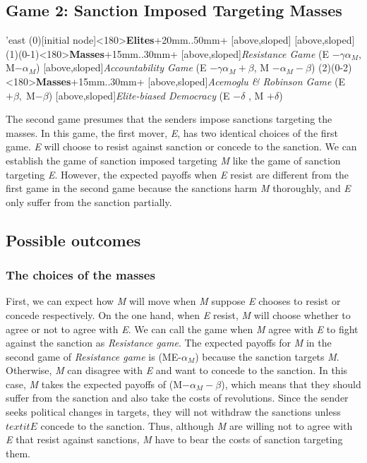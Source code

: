 \documentclass[11pt]{article}
\begin{document}
	
	
	\subsection*{Game 2: Sanction Imposed Targeting Masses}
	\begin{istgame}[font=\footnotesize]
		\centering
		\setistgrowdirection'{east}
		\xtShowArrows
		\istroot(0)[initial node]<180>{\textbf{Elites}}+20mm..50mm+
		[above,sloped]  [above,sloped] \endist
		\istroot(1)(0-1)<180>{\textbf{Masses}}+15mm..30mm+
		[above,sloped]{\textit{Resistance Game} (E $- \gamma\alpha_{M}$, M$-\alpha_{M}$) }
		[above,sloped]{\textit{Accountability Game} (E $- \gamma\alpha_{M} + \beta$, M $- \alpha_{M} - \beta$)}  \endist
		\istroot(2)(0-2)<180>{\textbf{Masses}}+15mm..30mm+
		[above,sloped]{\textit{Acemoglu \& Robinson Game} (E $+ \beta,\; $M$-\beta$)}
		[above,sloped]{\textit{Elite-biased Democracy} (E $-\delta$ , M $+ \delta$)} \endist
	\end{istgame}
	
	The second game presumes that the senders impose sanctions targeting the masses. In this game, the first mover, \textit{E}, has two identical choices of the first game. \textit{E} will choose to resist against sanction or concede to the sanction. We can establish the game of sanction imposed targeting \textit{M} like the game of sanction targeting \textit{E}. However, the expected payoffs when \textit{E} resist are different from the first game in the second game because the sanctions harm \textit{M} thoroughly, and \textit{E} only suffer from the sanction partially.
	
	\subsection*{Possible outcomes}
	
	\subsubsection*{The choices of the masses}
	
	First, we can expect how \textit{M} will move when \textit{M} suppose \textit{E} chooses to resist or concede respectively. On the one hand, when \textit{E} resist, \textit{M} will choose whether to agree or not to agree with \textit{E}. We can call the game when \textit{M} agree with \textit{E} to fight against the sanction as \textit{Resistance game}. The expected payoffs for \textit{M} in the second game of \textit{Resistance game} is (ME-$\alpha_{M}$) because the sanction targets \textit{M}. Otherwise, \textit{M} can disagree with \textit{E} and want to concede to the sanction. In this case, \textit{M} takes the expected payoffs of (M$-\alpha_{M}-\beta$), which means that they should suffer from the sanction and also take the costs of revolutions. Since the sender seeks political changes in targets, they will not withdraw the sanctions unless $textit{E}$ concede to the sanction. Thus, although \textit{M} are willing not to agree with \textit{E} that resist against sanctions, \textit{M} have to bear the costs of sanction targeting them.
	
\end{document}
